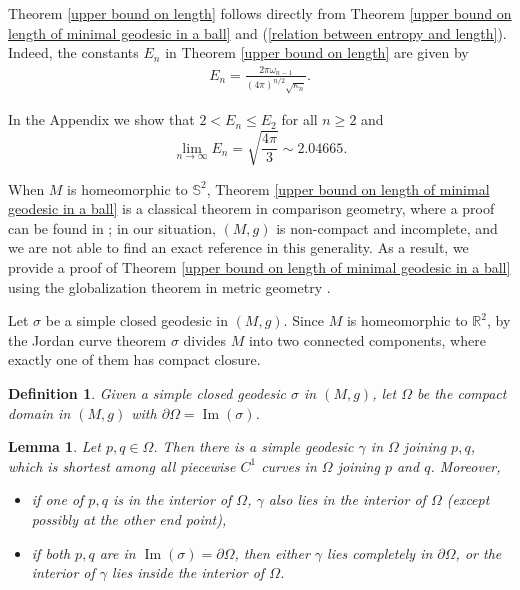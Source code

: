 \documentclass[12pt]{amsart}
\numberwithin{equation}{section}
\newtheorem{lem}[thm]{Lemma}
\newtheorem{dfn}[thm]{Definition}
\theoremstyle{remark}
\begin{document}
	Theorem \ref{upper bound on length} follows directly from Theorem \ref{upper bound on length of minimal geodesic in a ball} and (\ref{relation between entropy and length}). Indeed, the constants $E_n$ in Theorem \ref{upper bound on length} are given by 
	\begin{align} \label{E_n constants}
		E_n = \frac{2\pi \omega_{n-1}}{(4\pi)^{n/2} \sqrt{\kappa_n}}. 
	\end{align}
	
	
	In the Appendix we show that $2< E_n \le E_2$ for all $n\ge 2$ and 
	$$\lim_{n\to \infty} E_n =  \sqrt{\frac{4\pi}{3}} \sim 2.04665.$$ 
	
	When $M$ is homeomorphic to $\mathbb S^2$, Theorem \ref{upper bound on length of minimal geodesic in a ball} is a classical theorem in comparison geometry, where a proof can be found in \cite[Theorem 3.4.10]{Klingenberg}; in our situation, $(M, g)$ is non-compact and incomplete, and we are not able to find an exact reference in this generality. As a result, we provide a proof of Theorem \ref{upper bound on length of minimal geodesic in a ball} using the globalization theorem in metric geometry \cite{BBI}. 
	
	Let $\sigma$ be a simple closed geodesic in $(M, g)$. Since $M$ is homeomorphic to $\mathbb R^2$, by the Jordan curve theorem $\sigma$ divides $M$ into two connected components, where exactly one of them has compact closure. 
	
	\begin{dfn} \label{dfn of sigma and omega}
		Given a simple closed geodesic $\sigma$ in $(M, g)$, let $\Omega$ be the compact domain in $(M, g)$ with $\partial \Omega = \operatorname{Im} (\sigma)$. 
	\end{dfn}
	
	\begin{lem} \label{shorest geo in Omega}
		Let $p, q\in \Omega$. Then there is a simple geodesic $\gamma$ in $\Omega$ joining $p, q$, which is shortest among all piecewise $C^1$ curves in $\Omega$ joining $p$ and $q$. Moreover, 
		\begin{itemize}
			\item [(i)] if one of $p, q$ is in the interior of $\Omega$, $\gamma$ also lies in the interior of $\Omega$ (except possibly at the other end point), 
			\item [(ii)] if both $p, q$ are in $\operatorname{Im}(\sigma) = \partial \Omega$, then either $\gamma$ lies completely in $\partial \Omega$, or the interior of $\gamma$ lies inside the interior of $\Omega$.
		\end{itemize}
	\end{lem}
	
\end{document}

